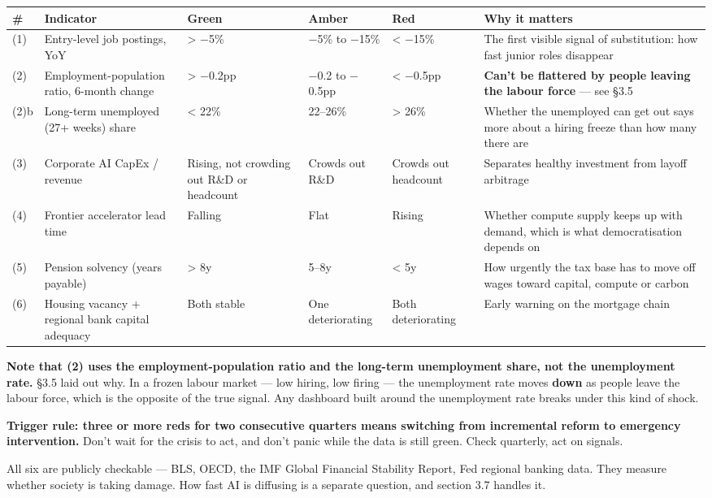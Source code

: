 \documentclass[11pt,a4paper]{article}
\begin{document}
\begin{center}
\small
\begin{tabularx}{\textwidth}{lXXXXX}
\toprule
\# & Indicator & Green & Amber & Red & Why it matters \\
\midrule
(1) & Entry-level job postings, YoY & > $-$5\% & $-$5\% to $-$15\% & < $-$15\% & The first visible signal of substitution: how fast junior roles disappear \\
(2) & Employment-population ratio, 6-month change & > $-$0.2pp & $-$0.2 to $-$0.5pp & < $-$0.5pp & \textbf{Can't be flattered by people leaving the labour force} --- see \S{}3.5 \\
(2)b & Long-term unemployed (27+ weeks) share & < 22\% & 22--26\% & > 26\% & Whether the unemployed can get out says more about a hiring freeze than how many there are \\
(3) & Corporate AI CapEx / revenue & Rising, not crowding out R\&D or headcount & Crowds out R\&D & Crowds out headcount & Separates healthy investment from layoff arbitrage \\
(4) & Frontier accelerator lead time & Falling & Flat & Rising & Whether compute supply keeps up with demand, which is what democratisation depends on \\
(5) & Pension solvency (years payable) & > 8y & 5--8y & < 5y & How urgently the tax base has to move off wages toward capital, compute or carbon \\
(6) & Housing vacancy + regional bank capital adequacy & Both stable & One deteriorating & Both deteriorating & Early warning on the mortgage chain \\
\bottomrule
\end{tabularx}
\end{center}

\textbf{Note that (2) uses the employment-population ratio and the long-term unemployment share, not the unemployment rate.} \S{}3.5 laid out why. In a frozen labour market --- low hiring, low firing --- the unemployment rate moves \textbf{down} as people leave the labour force, which is the opposite of the true signal. Any dashboard built around the unemployment rate breaks under this kind of shock.

\textbf{Trigger rule: three or more reds for two consecutive quarters means switching from incremental reform to emergency intervention.} Don't wait for the crisis to act, and don't panic while the data is still green. Check quarterly, act on signals.

All six are publicly checkable --- BLS, OECD, the IMF Global Financial Stability Report, Fed regional banking data. They measure whether society is taking damage. How fast AI is diffusing is a separate question, and section 3.7 handles it.
\end{document}

